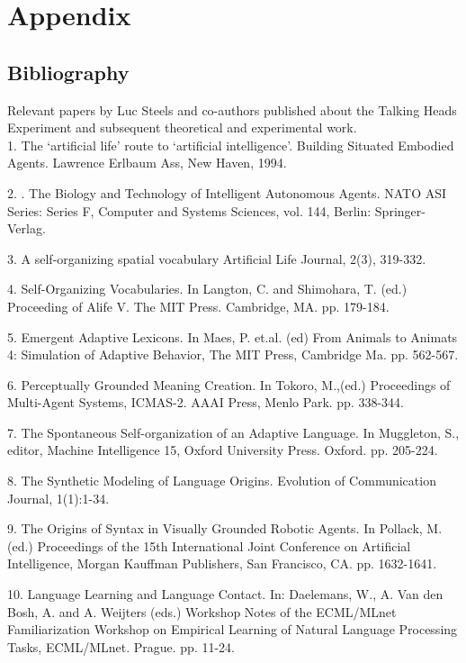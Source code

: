 \chapter{Appendix}
\label{c:references}

\section{Bibliography}

Relevant papers by Luc Steels and co-authors published about the Talking Heads Experiment and subsequent theoretical 
and experimental work. \\

1. \citet{Steels:94a} The `artificial life' route to `artificial intelligence'. Building Situated Embodied Agents. Lawrence Erlbaum Ass, New Haven, 1994.

2. \citet{Steels:95a}. The Biology and Technology of Intelligent Autonomous Agents. NATO ASI Series: Series F, Computer and Systems Sciences, vol. 144, Berlin: Springer-Verlag.

3. \citet{Steels:95b} A self-organizing spatial vocabulary Artificial Life Journal, 2(3), 319-332. 

4. \citet{Steels:96a} Self-Organizing Vocabularies. In Langton, C. and Shimohara, T. (ed.) Proceeding of 
Alife V. The MIT Press. Cambridge, MA. pp. 179-184. 

5. \citet{Steels:96b} Emergent Adaptive Lexicons. In Maes, P. et.al. (ed) From Animals to Animats 4: Simulation of Adaptive Behavior, The MIT Press, Cambridge Ma. pp. 562-567. 

6. \citet{Steels:96c} Perceptually Grounded Meaning Creation. In Tokoro, M.,(ed.) Proceedings of Multi-Agent Systems, ICMAS-2. AAAI Press, Menlo Park. pp. 338-344. 

7. \citet{Steels:97a} The Spontaneous Self-organization of an Adaptive Language. In Muggleton, S., editor, Machine Intelligence 15, Oxford University Press. Oxford. pp. 205-224. 

8. \citet{Steels:97b} The Synthetic Modeling of Language Origins. Evolution of Communication Journal, 1(1):1-34. 

9. \citet{Steels:97c} The Origins of Syntax in Visually Grounded Robotic Agents. In Pollack, M. (ed.) Proceedings of the 15th International Joint Conference on Artificial Intelligence, Morgan Kauffman Publishers, San Francisco, CA. pp. 1632-1641. 

10. \citet{Steels:97d} Language Learning and Language Contact. In: Daelemans, W., A. Van den Bosh, A. and A. Weijters (eds.)
Workshop Notes of the ECML/MLnet Familiarization Workshop on Empirical Learning of Natural Language 
Processing Tasks, ECML/MLnet. Prague. pp. 11-24. 

